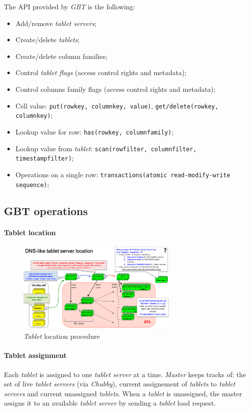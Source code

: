 \bigskip\noindent
The API provided by \emph{GBT} is the following:
\begin{itemize}
    \item Add/remove \emph{tablet servers};
    \item Create/delete \emph{tablets};
    \item Create/delete column families;
    \item Control \emph{tablet flags} (access control rights and metadata);
    \item Control columns family flags (access control rights and metadata);
    \item Cell value: \texttt{put(rowkey, columnkey, value)},
    \texttt{get/delete(rowkey, columnkey)};
    \item Lookup value for row: \texttt{has(rowkey, columnfamily)};
    \item Lookup value from \emph{tablet}: \texttt{scan(rowfilter, columnfilter, timestampfilter)};
    \item Operations on a single row: \texttt{transactions(atomic read-modify-write sequence)};
\end{itemize}

\subsection{GBT operations}
\paragraph{Tablet location}\mbox{}

\begin{figure}[h!]
    \centering
    \includegraphics[width=0.7\textwidth]{images/gbt-tablet-location.png}
    \caption{\emph{Tablet} location procedure}
\end{figure}

\paragraph{Tablet assignment}
Each \emph{tablet} is assigned to one \emph{tablet server} at a time.
\emph{Master} keeps tracks of: the set of live \emph{tablet servers} (via
\emph{Chubby}), current assignement of \emph{tablets} to \emph{tablet servers}
and current unassigned \emph{tablets}. When a \emph{tablet} is unassigned, the
master assigns it to an available \emph{tablet server} by sending a \emph{tablet}
load request.

